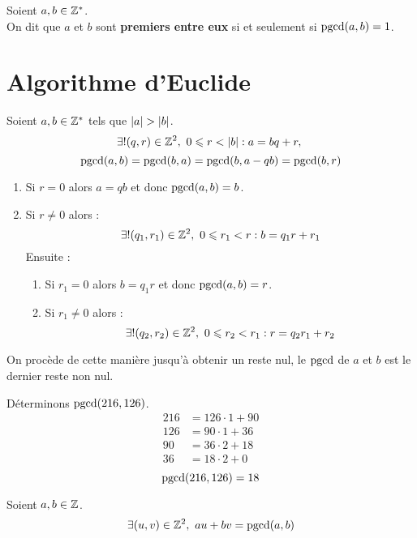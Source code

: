 \begin{definition}
	Soient $a, b \in \mathbb{Z}^*$. 
	\\	
	On dit que $a$ et $b$ sont \textbf{premiers entre eux} si et seulement si $\operatorname{pgcd}(a, b) = 1$.
\end{definition}

\section{Algorithme d'Euclide}
\begin{proposition}
	Soient $a, b \in \mathbb{Z}^*$ tels que $\abs{a} > \abs{b}$.
	\[ \exists ! (q, r) \in \mathbb{Z}^2,\ 0 \leqslant r < \abs{b} : a = bq + r,\  \]
	\[ \operatorname{pgcd}(a, b) = \operatorname{pgcd}(b, a) = \operatorname{pgcd}(b, a - qb) = \operatorname{pgcd}(b, r) \]
	\begin{enumerate}
		\item Si $r = 0$ alors $a = qb$ et donc $\operatorname{pgcd}(a, b) = b$.
		\item Si $r \neq 0$ alors :
		\[ \exists ! (q_1, r_1) \in \mathbb{Z}^2,\ 0 \leqslant r_1 < r : b = q_1 r + r_1 \]
		Ensuite : 
		\begin{enumerate}
			\item Si $r_1 = 0$ alors $b = q_1 r$ et donc $\operatorname{pgcd}(a, b) = r$.
			\item Si $r_1 \neq 0$ alors :
			\[ \exists ! (q_2, r_2) \in \mathbb{Z}^2,\ 0 \leqslant r_2 < r_1 : r = q_2 r_1 + r_2 \]
		\end{enumerate}
	\end{enumerate}
	On procède de cette manière jusqu'à obtenir un reste nul, le $\operatorname{pgcd}$ de $a$ et $b$ est le dernier reste non nul.
\end{proposition}

\begin{example}
	Déterminons $\operatorname{pgcd}(216, 126)$.
	\begin{align*}
		216 &= 126 \cdot 1 + 90 \\
		126 &= 90 \cdot 1 + 36 \\
		90  &= 36 \cdot 2 + 18 \\
		36  &= 18 \cdot 2 + 0
	\end{align*}
	\[ \operatorname{pgcd}(216, 126) = 18 \]
\end{example}

\begin{theorem}
	Soient $a, b \in \mathbb{Z}$.
	\[ \exists (u, v) \in \mathbb{Z}^2,\ au + bv = \operatorname{pgcd}(a, b) \]
\end{theorem}

